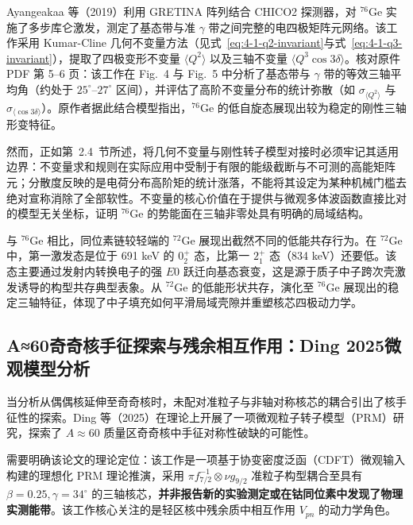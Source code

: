 Ayangeakaa 等（2019）\cite{ayangeakaa-2019-rigid-triaxial-ge76}利用 GRETINA 阵列结合 CHICO2 探测器，对 $^{76}\mathrm{Ge}$ 实施了多步库仑激发，测定了基态带与准 $\gamma$ 带之间完整的电四极矩阵元网络。该工作采用 Kumar-Cline 几何不变量方法（见式~\eqref{eq:4-1-q2-invariant}与式~\eqref{eq:4-1-q3-invariant}），提取了四极变形不变量 $\langle Q^2 \rangle$ 以及三轴不变量 $\langle Q^3 \cos 3\delta \rangle$。核对原件 PDF 第 5–6 页：该工作在 Fig.~4 与 Fig.~5 中分析了基态带与 $\gamma$ 带的等效三轴平均角（约处于 $25^\circ\text{--}27^\circ$ 区间），并评估了高阶不变量分布的统计弥散（如 $\sigma_{\langle Q^2 \rangle}$ 与 $\sigma_{\langle \cos 3\delta \rangle}$）。原作者据此结合模型指出，$^{76}\mathrm{Ge}$ 的低自旋态展现出较为稳定的刚性三轴形变特征。

然而，正如第~2.4~节所述，将几何不变量与刚性转子模型对接时必须牢记其适用边界：不变量求和规则在实际应用中受制于有限的能级截断与不可测的高能矩阵元；分散度反映的是电荷分布高阶矩的统计涨落，不能将其设定为某种机械门槛去绝对宣称消除了全部软性。不变量的核心价值在于提供与微观多体波函数直接比对的模型无关坐标，证明 $^{76}\mathrm{Ge}$ 的势能面在三轴非零处具有明确的局域结构。

与 $^{76}\mathrm{Ge}$ 相比，同位素链较轻端的 $^{72}\mathrm{Ge}$ 展现出截然不同的低能共存行为。在 $^{72}\mathrm{Ge}$ 中，第一激发态是位于 691 keV 的 $0^+_2$ 态，比第一 $2^+_1$ 态（834 keV）还要低。该态主要通过发射内转换电子的强 $E0$ 跃迁向基态衰变，这是源于质子中子跨次壳激发诱导的构型共存典型表象。从 $^{72}\mathrm{Ge}$ 的低能形状共存，演化至 $^{76}\mathrm{Ge}$ 展现出的稳定三轴特征，体现了中子填充如何平滑局域壳隙并重塑核芯四极动力学。

\subsection{A≈60奇奇核手征探索与残余相互作用：Ding 2025微观模型分析}\label{sec:4-2-5}

当分析从偶偶核延伸至奇奇核时，未配对准粒子与非轴对称核芯的耦合引出了核手征性的探索。Ding 等（2025）\cite{ding-2025-chiral-rotation-a60-residual-interactions}在理论上开展了一项微观粒子转子模型（PRM）研究，探索了 $A\approx 60$ 质量区奇奇核中手征对称性破缺的可能性。

需要明确该论文的理论定位：该工作是一项基于协变密度泛函（CDFT）微观输入构建的理想化 PRM 理论推演，采用 $\pi f_{7/2}^{-1} \otimes \nu g_{9/2}$ 准粒子构型耦合至具有 $\beta=0.25, \gamma=34^\circ$ 的三轴核芯，\textbf{并非报告新的实验测定或在钴同位素中发现了物理实测能带}。该工作核心关注的是轻区核中残余质中相互作用 $V_{pn}$ 的动力学角色。

